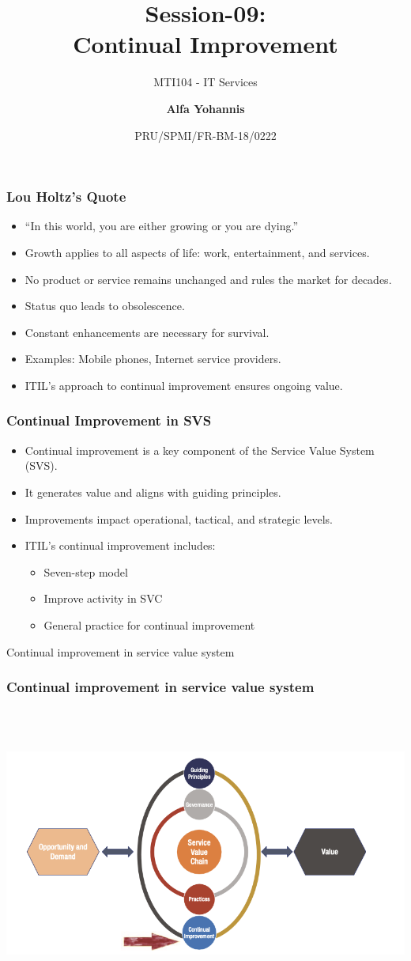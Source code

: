 \documentclass[aspectratio=169, table]{beamer}
\subtitle{MTI104 - IT Services}
\title{Session-09:\\\LARGE{Continual Improvement\\}}
\date[Serial]{\scriptsize {PRU/SPMI/FR-BM-18/0222}}
\author[Pradita]{\small{\textbf{Alfa Yohannis}}}
\begin{document}
\frame{\titlepage}

	
	\begin{frame}
		\frametitle{Lou Holtz's Quote}
		\begin{itemize}
			\item “In this world, you are either growing or you are dying.”
			\item Growth applies to all aspects of life: work, entertainment, and services.
			\item No product or service remains unchanged and rules the market for decades.
			\item Status quo leads to obsolescence.
			\item Constant enhancements are necessary for survival.
			\item Examples: Mobile phones, Internet service providers.
			\item ITIL's approach to continual improvement ensures ongoing value.
		\end{itemize}
	\end{frame}
	
	\begin{frame}
		\frametitle{Continual Improvement in SVS}
		\begin{itemize}
			\item Continual improvement is a key component of the Service Value System (SVS).
			\item It generates value and aligns with guiding principles.
			\item Improvements impact operational, tactical, and strategic levels.
			\item ITIL's continual improvement includes:
			\begin{itemize}
				\item Seven-step model
				\item Improve activity in SVC
				\item General practice for continual improvement
			\end{itemize}
		\end{itemize}
	\end{frame}
	
	\begin{frame}{Continual improvement in service value system} 	 \frametitle{Continual improvement in service value system} \begin{center} 	\includegraphics[width=0.8\linewidth]{images/image-01.png} \end{center} \end{frame}
	
\end{document}
